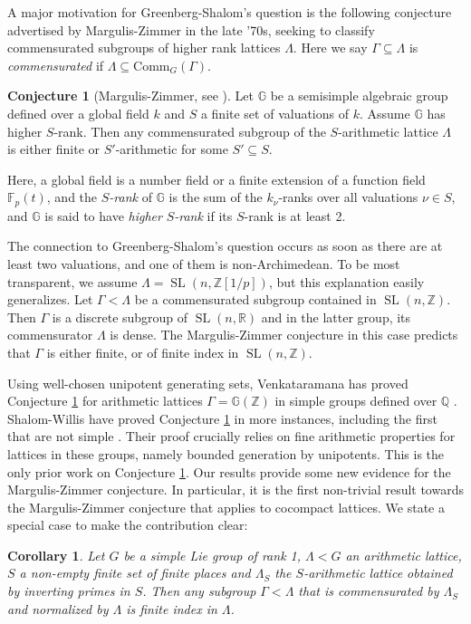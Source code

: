 \documentclass[11pt]{article}
\numberwithin{equation}{section}\providecommand{\llangle}{\langle\!\langle}\providecommand{\rrangle}{\rangle\!\rangle}\providecommand{\Asterisk}{\ast}
\newcommand{\G}{\ensuremath{\mathbb{G}}}
\newcommand{\bbF}{\ensuremath{\mathbb{F}}}
\newcommand{\bbQ}{\ensuremath{\mathbb{Q}}}
\newcommand{\bbR}{\ensuremath{\mathbb{R}}}
\newcommand{\bbZ}{\ensuremath{\mathbb{Z}}}
\DeclareMathOperator{\SL}{SL}
\newtheorem{cor}[thm]{Corollary}
\theoremstyle{definition}
\newtheorem{conj}[thm]{Conjecture}
\begin{document}
A major motivation for Greenberg-Shalom's question is the following conjecture advertised by Margulis-Zimmer in the late '70s, seeking to classify commensurated subgroups of higher rank lattices $\Lambda$. Here we say $\Gamma\subseteq\Lambda$ is \emph{commensurated} if $\Lambda\subseteq \text{Comm}_G(\Gamma)$.

\begin{conj}[{Margulis-Zimmer, see \cite{shalom-willis}}] \label{conj:mz}
Let $\G$ be a semisimple algebraic group defined over a global field $k$ and $S$ a finite set of valuations of $k$. Assume $\G$ has higher $S$-rank. Then any commensurated subgroup of the $S$-arithmetic lattice $\Lambda$ is either finite or $S'$-arithmetic for some $S'\subseteq S$.
\end{conj}

Here, a global field is a number field or a finite extension of a function field $\bbF_p(t)$, and the $S$\emph{-rank} of $\G$ is the sum of the $k_{\nu}$-ranks over all valuations $\nu\in S$, and $\G$ is said to have \emph{higher }$S$\emph{-rank} if its $S$-rank is at least 2.

The connection to Greenberg-Shalom's question occurs as soon as there are at least two valuations, and one of them is non-Archimedean.
To be most transparent, we assume $\Lambda = \SL(n, \bbZ[1/p])$, but this explanation easily generalizes. Let $\Gamma < \Lambda$ be a commensurated subgroup contained in $\SL(n, \bbZ)$.
Then $\Gamma$ is a discrete subgroup of $\SL(n,\bbR)$ and in the latter group, its commensurator $\Lambda$ is dense. The Margulis-Zimmer conjecture in this case predicts that $\Gamma$ is either finite, or of finite index in $\SL(n,\mathbb{Z})$.

Using well-chosen unipotent generating sets, Venkataramana has proved Conjecture \ref{conj:mz} for arithmetic lattices $\Gamma=\G(\bbZ)$ in simple groups defined over $\bbQ$ \cite{venkataramana-mz}. Shalom-Willis have proved Conjecture \ref{conj:mz} in more instances, including the first that are not simple \cite{shalom-willis}. Their proof crucially relies on fine arithmetic properties for lattices in these groups, namely bounded generation by unipotents. This is the only prior work on Conjecture \ref{conj:mz}. Our results provide some new evidence for the Margulis-Zimmer conjecture. In particular, it is the first non-trivial result towards the Margulis-Zimmer conjecture that applies to cocompact lattices. We state a special case to make the contribution clear:

\begin{cor}
\label{corollary:marguliszimmer}
Let $G$ be a simple Lie group of rank 1, $\Lambda < G$ an arithmetic lattice, $S$ a non-empty finite set of finite places and $\Lambda_S$ the $S$-arithmetic lattice obtained by inverting primes in $S$. Then any subgroup $\Gamma< \Lambda$ that is commensurated by $\Lambda_S$ and normalized by $\Lambda$ is finite index in $\Lambda$.
\end{cor}
\end{document}
